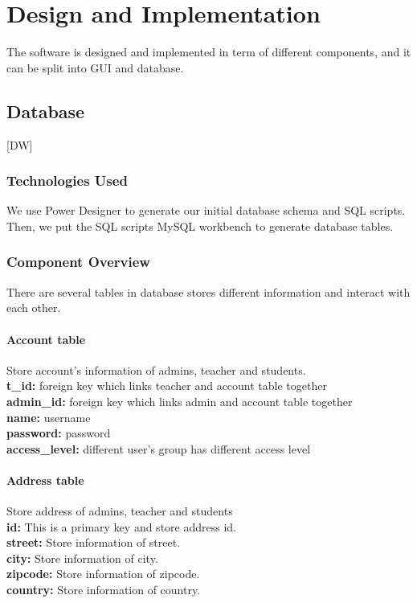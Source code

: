 
\chapter{Design  and Implementation}
The software is designed and implemented in term of different components, and it can be split into GUI and database. \\



\section{Database}
[DW]

\subsection{Technologies  Used}
We use Power Designer to generate our initial database schema and SQL scripts. Then, we put the SQL scripts MySQL workbench to generate database tables.

\subsection{Component Overview}
There are several tables in database stores different information and interact with each other.\\

\subsubsection{Account table}
Store account's information of admins, teacher and students.\\
\textbf{t\_id:} foreign key which links teacher and account table together\\
\textbf{admin\_id:} foreign key which links admin and account table together\\
\textbf{name:} username\\
\textbf{password:} password\\
\textbf{access\_level:} different user's group has different access level

\subsubsection{Address table}
Store address of admins, teacher and students\\
\textbf{id:} This is a primary key and store address id.\\
\textbf{street:} Store information of street.\\
\textbf{city:} Store information of city.\\
\textbf{zipcode:} Store information of zipcode.\\
\textbf{country:} Store information of country.\\
